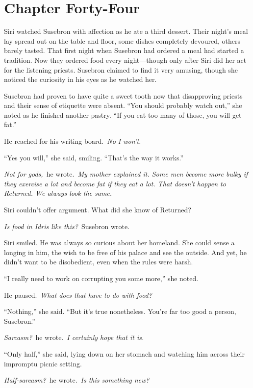 \section{Chapter Forty-Four}

Siri watched Susebron with affection as he ate a third dessert. Their night’s meal lay spread out on the table and floor, some dishes completely devoured, others barely tasted. That first night when Susebron had ordered a meal had started a tradition. Now they ordered food every night—though only after Siri did her act for the listening priests. Susebron claimed to find it very amusing, though she noticed the curiosity in his eyes as he watched her.

Susebron had proven to have quite a sweet tooth now that disapproving priests and their sense of etiquette were absent. “You should probably watch out,” she noted as he finished another pastry. “If you eat too many of those, you will get fat.”

He reached for his writing board.~\textit{No I won’t.}

“Yes you will,” she said, smiling. “That’s the way it works.”

\textit{Not for gods,}~he wrote.~\textit{My mother explained it. Some men become more bulky if they exercise a lot and become fat if they eat a lot. That doesn’t happen to Returned. We always look the same.}

Siri couldn’t offer argument. What did she know of Returned?

\textit{Is food in Idris like this?}~Susebron wrote.

Siri smiled. He was always so curious about her homeland. She could sense a longing in him, the wish to be free of his palace and see the outside. And yet, he didn’t want to be disobedient, even when the rules were harsh.

“I really need to work on corrupting you some more,” she noted.

He paused.~\textit{What does that have to do with food?}

“Nothing,” she said. “But it’s true nonetheless. You’re far too good a person, Susebron.”

\textit{Sarcasm?}~he wrote.~\textit{I certainly hope that it is.}

“Only half,” she said, lying down on her stomach and watching him across their impromptu picnic setting.

\textit{Half-sarcasm?}~he wrote.~\textit{Is this something new?}


